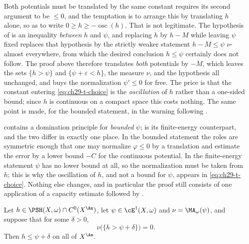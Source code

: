 \begin{warning}{Both potentials must be translated by the same constant}
\label{warn:ch29-same-translation}
 requires its second argument to be
\(\leq0\), and the temptation is to arrange this by translating \(h\) alone,
so as to write \(0\geq h\geq-\operatorname{osc}(h)\).  That is not
legitimate.  The hypothesis of  is an
inequality \emph{between} \(h\) and \(\psi\), and replacing \(h\) by
\(h-M\) while leaving \(\psi\) fixed replaces that hypothesis by the
strictly weaker statement \(h-M\leq\psi\) \(\nu\)-almost everywhere, from
which the desired conclusion \(h\leq\psi\) certainly does not follow.  The
proof above therefore translates \emph{both} potentials by \(-M\), which
leaves the sets \(\{h>\psi\}\) and \(\{\psi+\varepsilon<h\}\), the measure
\(\nu\), and the hypothesis all unchanged, and buys the normalization
\(\psi'\leq0\) for free.  The price is that the constant entering
\eqref{eq:ch29-t-choice} is the \emph{oscillation} of \(h\) rather than a
one-sided bound; since \(h\) is continuous on a compact space this costs
nothing.  The same point is made, for the bounded statement, in the warning
following .
\end{warning}

\begin{remark}
\label{rem:ch29-bounded-vs-e1-domination}
 contains a domination principle for
\emph{bounded} \(\psi\);  is its
finite-energy counterpart, and the two differ in exactly one place.  In the
bounded statement the roles are symmetric enough that one may normalize
\(\varphi\leq0\) by a translation and estimate the error by a lower bound
\(-C\) for the continuous potential.  In the finite-energy statement
\(\psi\) has no lower bound at all, so the normalization must be taken from
\(h\); this is why the oscillation of \(h\), and not a bound for \(\psi\),
appears in \eqref{eq:ch29-t-choice}.  Nothing else changes, and in
particular the proof still consists of one application of a capacity
estimate followed by
.
\end{remark}

\begin{corollary}
\label{cor:ch29-domination-quantitative}
Let \(h\in\PSH(X,\omega)\cap C^0(X^{\An})\), let
\(\psi\in\cE^1(X,\omega)\) and \(\nu=\MA_\omega(\psi)\), and suppose that
for some \(\delta>0\),
\[
 \nu\bigl(\{h>\psi+\delta\}\bigr)=0 .
\]
Then \(h\leq\psi+\delta\) on all of \(X^{\An}\).
\end{corollary}

